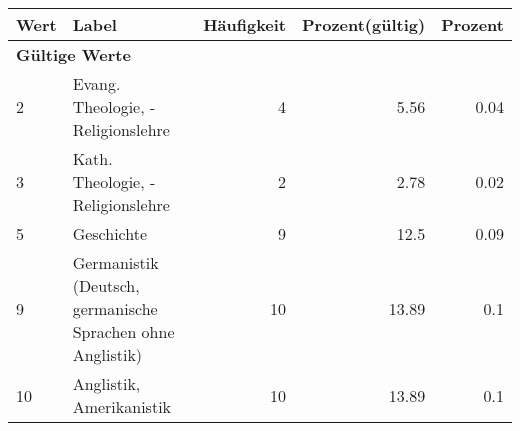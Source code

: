      \begin{longtable}{lXrrr}
     \toprule
     \textbf{Wert} & \textbf{Label} & \textbf{Häufigkeit} & \textbf{Prozent(gültig)} & \textbf{Prozent} \\
     \endhead
     \midrule
     \multicolumn{5}{l}{\textbf{Gültige Werte}}\\

     2 &
     \multicolumn{1}{X}{ Evang. Theologie, -Religionslehre   } &


       \num{4} &
       \num[round-mode=places,round-precision=2]{5.56} &
         \num[round-mode=places,round-precision=2]{0.04} \\

     3 &
     \multicolumn{1}{X}{ Kath. Theologie, -Religionslehre   } &


       \num{2} &
       \num[round-mode=places,round-precision=2]{2.78} &
         \num[round-mode=places,round-precision=2]{0.02} \\

     5 &
     \multicolumn{1}{X}{ Geschichte   } &


       \num{9} &
       \num[round-mode=places,round-precision=2]{12.5} &
         \num[round-mode=places,round-precision=2]{0.09} \\

     9 &
     \multicolumn{1}{X}{ Germanistik (Deutsch, germanische Sprachen ohne Anglistik)   } &


       \num{10} &
       \num[round-mode=places,round-precision=2]{13.89} &
         \num[round-mode=places,round-precision=2]{0.1} \\

     10 &
     \multicolumn{1}{X}{ Anglistik, Amerikanistik   } &


       \num{10} &
       \num[round-mode=places,round-precision=2]{13.89} &
         \num[round-mode=places,round-precision=2]{0.1} \\


\end{longtable}
